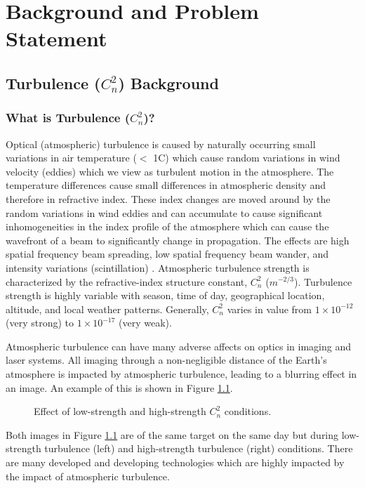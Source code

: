 \chapter{Background and Problem Statement}
\label{ch1}

\section{Turbulence ($C_{n}^{2}$) Background}
\subsection{What is Turbulence ($C_{n}^{2}$)?}
Optical (atmospheric) turbulence is caused by naturally occurring small variations in air temperature ($<$ 1\textdegree C) which cause random variations in wind velocity (eddies) which we view as turbulent motion in the atmosphere. The temperature differences cause small differences in atmospheric density and therefore in refractive index. These index changes are moved around by the random variations in wind eddies and can accumulate to cause significant inhomogeneities in the index profile of the atmosphere which can cause the wavefront of a beam to significantly change in propagation. The effects are high spatial frequency beam spreading, low spatial frequency beam wander, and intensity variations (scintillation) \cite{tyson2011principles}. Atmospheric turbulence strength is characterized by the refractive-index structure constant, $C_{n}^{2}$ ($m^{-2/3}$). Turbulence strength is highly variable with season, time of day, geographical location, altitude, and local weather patterns. Generally, $C_{n}^{2}$ varies in value from $1 \times 10^{-12}$ (very strong) to $1 \times 10^{-17}$ (very weak).

Atmospheric turbulence can have many adverse affects on optics in imaging and laser systems. All imaging through a non-negligible distance of the Earth's atmosphere is impacted by atmospheric turbulence, leading to a blurring effect in an image. An example of this is shown in Figure \ref{fig:first_frames}.
\begin{figure}[h!]
	\centering
	\hfill
	\caption{Effect of low-strength and high-strength $C_{n}^{2}$ conditions.}
	\label{fig:first_frames}
\end{figure}
Both images in Figure \ref{fig:first_frames} are of the same target on the same day but during low-strength turbulence (left) and high-strength turbulence (right) conditions. There are many developed and developing technologies which are highly impacted by the impact of atmospheric turbulence.

